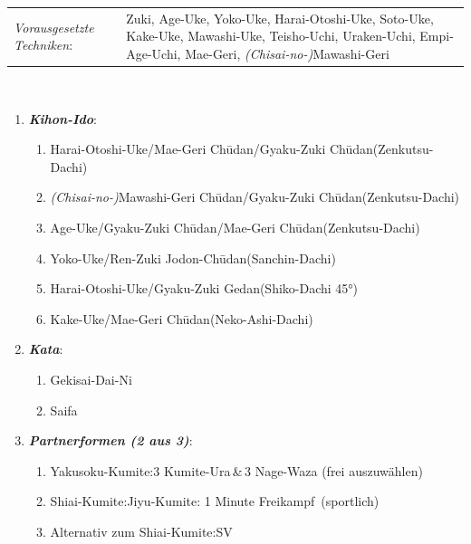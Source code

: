 \documentclass[a5paper,landscape,DIV=calc,11pt,notitlepage]{scrartcl}
\begin{document}
\begin{tcolorbox}[colback=white,colframe=BLBELT,coltitle=white,title=5. Kyu: Blau]
	\renewcommand{\labelenumi}{\alph{enumi}.)}
	\renewcommand{\labelenumii}{\arabic*.}
	{\scriptsize
	\begin{tabularx}{\textwidth}{lX}
		\textit{Vorausgesetzte Techniken}:& Zuki, Age-Uke, Yoko-Uke, Harai-Otoshi-Uke, Soto-Uke, Kake-Uke, Mawashi-Uke, Teisho-Uchi, Uraken-Uchi, \mbox{Empi-Age-Uchi}, Mae-Geri, \textit{(Chisai-no-)}Mawashi-Geri
	\end{tabularx}\\}
	\begin{enumerate}[nosep]
		\item \textit{\textbf{Kihon-Ido}}:
		\begin{enumerate}[nosep]
			\item Harai-Otoshi-Uke/Mae-Geri Ch\={u}dan/Gyaku-Zuki Ch\={u}dan\tabto{280pt}(Zenkutsu-Dachi)
			\item \textit{(Chisai-no-)}Mawashi-Geri Ch\={u}dan/Gyaku-Zuki Ch\={u}dan\tabto{280pt}(Zenkutsu-Dachi)
			\item Age-Uke/Gyaku-Zuki Ch\={u}dan/Mae-Geri Ch\={u}dan\tabto{280pt}(Zenkutsu-Dachi)
			\item Yoko-Uke/Ren-Zuki Jodon-Ch\={u}dan\tabto{280pt}(Sanchin-Dachi)
			\item Harai-Otoshi-Uke/Gyaku-Zuki Gedan\tabto{280pt}(Shiko-Dachi 45°)
			\item Kake-Uke/Mae-Geri Ch\={u}dan\tabto{280pt}(Neko-Ashi-Dachi)
		\end{enumerate}
		\item \textit{\textbf{Kata}}:
		\begin{enumerate}[nosep]
			\item Gekisai-Dai-Ni
			\item Saifa
		\end{enumerate}
		\item \textit{\textbf{Partnerformen (2 aus 3)}}:
		\begin{enumerate}[nosep]
			\item Yakusoku-Kumite:\tabto{200pt}3 Kumite-Ura\,\&\,3 Nage-Waza (frei auszuwählen)
			\item Shiai-Kumite:\tabto{200pt}Jiyu-Kumite: 1 Minute \frqq Freikampf\flqq~(sportlich)
			\item Alternativ zum Shiai-Kumite:\tabto{200pt}SV
		\end{enumerate}
	\end{enumerate}
\end{tcolorbox}
\end{document}
